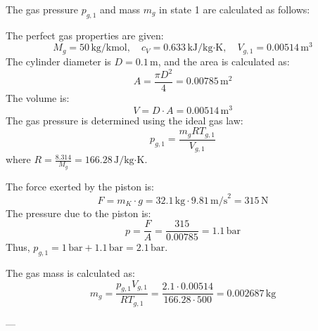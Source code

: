 The gas pressure \( p_{g,1} \) and mass \( m_g \) in state 1 are calculated as follows:  

The perfect gas properties are given:  
\[
M_g = 50 \, \text{kg/kmol}, \quad c_V = 0.633 \, \text{kJ/kg·K}, \quad V_{g,1} = 0.00514 \, \text{m}^3
\]  
The cylinder diameter is \( D = 0.1 \, \text{m} \), and the area is calculated as:  
\[
A = \frac{\pi D^2}{4} = 0.00785 \, \text{m}^2
\]  
The volume is:  
\[
V = D \cdot A = 0.00514 \, \text{m}^3
\]  
The gas pressure is determined using the ideal gas law:  
\[
p_{g,1} = \frac{m_g R T_{g,1}}{V_{g,1}}
\]  
where \( R = \frac{8.314}{M_g} = 166.28 \, \text{J/kg·K} \).  

The force exerted by the piston is:  
\[
F = m_K \cdot g = 32.1 \, \text{kg} \cdot 9.81 \, \text{m/s}^2 = 315 \, \text{N}
\]  
The pressure due to the piston is:  
\[
p = \frac{F}{A} = \frac{315}{0.00785} = 1.1 \, \text{bar}
\]  
Thus, \( p_{g,1} = 1 \, \text{bar} + 1.1 \, \text{bar} = 2.1 \, \text{bar} \).  

The gas mass is calculated as:  
\[
m_g = \frac{p_{g,1} V_{g,1}}{R T_{g,1}} = \frac{2.1 \cdot 0.00514}{166.28 \cdot 500} = 0.002687 \, \text{kg}
\]  

---